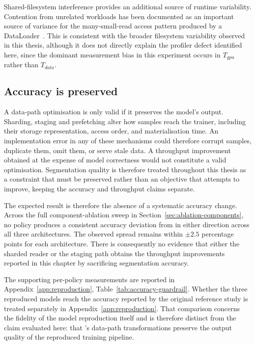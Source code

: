 Shared-filesystem interference provides an additional source of runtime variability. Contention from unrelated workloads has been documented as an important source of variance for the many-small-read access pattern produced by a DataLoader~\cite{Coles26}. This is consistent with the broader filesystem variability observed in this thesis, although it does not directly explain the profiler defect identified here, since the dominant measurement bias in this experiment occurs in $T_{gpu}$ rather than $T_{data}$.

\subsection{Accuracy is preserved}
\label{sec:res-accuracy}

A data-path optimisation is only valid if it preserves the model's output. Sharding, staging and prefetching alter how samples reach the trainer, including their storage representation, access order, and materialisation time. An implementation error in any of these mechanisms could therefore corrupt samples, duplicate them, omit them, or serve stale data. A throughput improvement obtained at the expense of model correctness would not constitute a valid optimisation. Segmentation quality is therefore treated throughout this thesis as a constraint that must be preserved rather than an objective that \pads{} attempts to improve, keeping the accuracy and throughput claims separate.

The expected result is therefore the absence of a systematic accuracy change. Across the full component-ablation sweep in Section~\ref{sec:ablation-components}, no policy produces a consistent accuracy deviation from  in either direction across all three architectures. The observed spread remains within $\pm2.5$ percentage points for each architecture. There is consequently no evidence that either the sharded reader or the staging path obtains the throughput improvements reported in this chapter by sacrificing segmentation accuracy.

The supporting per-policy measurements are reported in Appendix~\ref{app:reproduction}, Table~\ref{tab:accuracy-guardrail}. Whether the three reproduced models reach the accuracy reported by the original reference study is treated separately in Appendix~\ref{app:reproduction}. That comparison concerns the fidelity of the model reproduction itself and is therefore distinct from the claim evaluated here: that \pads{}'s data-path transformations preserve the output quality of the reproduced training pipeline.

